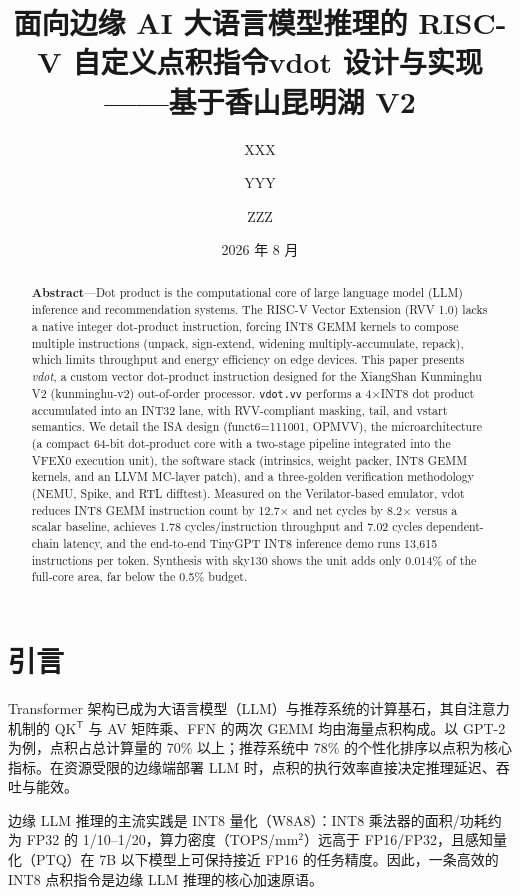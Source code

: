 \documentclass[11pt]{article}
\title{\textbf{面向边缘 AI 大语言模型推理的 RISC-V 自定义点积指令\newline vdot 设计与实现——基于香山昆明湖 V2}}
\author{XXX \and YYY \and ZZZ}
\date{2026 年 8 月}
\begin{document}
\maketitle

\begin{abstract}
\noindent\textbf{Abstract}---Dot product is the computational core of large language model (LLM) inference and recommendation systems. The RISC-V Vector Extension (RVV 1.0) lacks a native integer dot-product instruction, forcing INT8 GEMM kernels to compose multiple instructions (unpack, sign-extend, widening multiply-accumulate, repack), which limits throughput and energy efficiency on edge devices. This paper presents \emph{vdot}, a custom vector dot-product instruction designed for the XiangShan Kunminghu V2 (kunminghu-v2) out-of-order processor. \texttt{vdot.vv} performs a 4$\times$INT8 dot product accumulated into an INT32 lane, with RVV-compliant masking, tail, and vstart semantics. We detail the ISA design (funct6=111001, OPMVV), the microarchitecture (a compact 64-bit dot-product core with a two-stage pipeline integrated into the VFEX0 execution unit), the software stack (intrinsics, weight packer, INT8 GEMM kernels, and an LLVM MC-layer patch), and a three-golden verification methodology (NEMU, Spike, and RTL difftest). Measured on the Verilator-based emulator, vdot reduces INT8 GEMM instruction count by 12.7$\times$ and net cycles by 8.2$\times$ versus a scalar baseline, achieves 1.78 cycles/instruction throughput and 7.02 cycles dependent-chain latency, and the end-to-end TinyGPT INT8 inference demo runs 13,615 instructions per token. Synthesis with sky130 shows the unit adds only 0.014\% of the full-core area, far below the 0.5\% budget.
\end{abstract}

\tableofcontents

\section{引言}
Transformer 架构已成为大语言模型（LLM）与推荐系统的计算基石，其自注意力机制的 QK$^\mathsf{T}$ 与 AV 矩阵乘、FFN 的两次 GEMM 均由海量点积构成。以 GPT-2 为例，点积占总计算量的 70\% 以上；推荐系统中 78\% 的个性化排序以点积为核心指标。在资源受限的边缘端部署 LLM 时，点积的执行效率直接决定推理延迟、吞吐与能效。

边缘 LLM 推理的主流实践是 INT8 量化（W8A8）：INT8 乘法器的面积/功耗约为 FP32 的 1/10--1/20，算力密度（TOPS/mm$^2$）远高于 FP16/FP32，且感知量化（PTQ）在 7B 以下模型上可保持接近 FP16 的任务精度。因此，一条高效的 INT8 点积指令是边缘 LLM 推理的核心加速原语。
\end{document}
